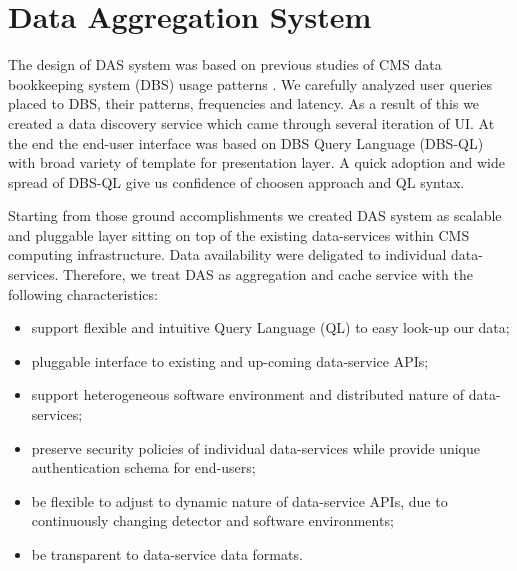 \documentclass[a4paper]{jpconf}
\begin{document}
\section{Data Aggregation System\label{DAS}}
The design of DAS system was based on previous studies of CMS 
data bookkeeping system (DBS) usage patterns \cite{DBS, DBS07}. We carefully analyzed user
queries placed to DBS, their patterns, frequencies and latency. As a result of this
we created a data discovery service \cite{DD} which came through several iteration
of UI. At the end the end-user interface was based on DBS Query Language (DBS-QL)\cite{DBS-QL}
with broad variety of template for presentation layer. A quick adoption
and wide spread of DBS-QL give us confidence of choosen approach and QL syntax.

Starting from those ground accomplishments we created DAS system as
scalable and pluggable layer sitting on top of the existing data-services
within CMS computing infrastructure. Data availability were deligated to individual
data-services. Therefore, we treat DAS as aggregation and cache service 
with the following characteristics:
\begin{itemize}
\item support flexible and intuitive Query Language (QL) to easy look-up our
data;
\item pluggable interface to existing and up-coming data-service APIs;
\item support heterogeneous software environment and distributed nature of data-services;
\item preserve security policies of individual data-services while provide unique
authentication schema for end-users;
\item be flexible to adjust to dynamic nature of data-service APIs, 
due to continuously changing detector and software environments;
\item be transparent to data-service data formats.
\end{itemize}
\end{document}
